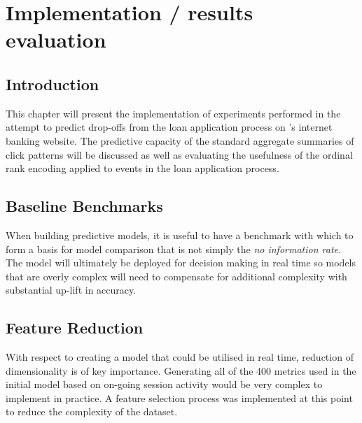 
\chapter{Implementation / results evaluation} %

\label{Chapter4} %


\section{Introduction}
This chapter will present the implementation of experiments performed in the attempt to predict drop-offs from the loan application process on \subjectname's internet banking website. The predictive capacity of the standard aggregate summaries of click patterns will be discussed as well as evaluating the usefulness of the ordinal rank encoding applied to events in the loan application process.


\section{Baseline Benchmarks}
When building predictive models, it is useful to have a benchmark with which to form a basis for model comparison that is not simply the \textit{no information rate}. The model will ultimately be deployed for decision making in real time so models that are overly complex will need to compensate for additional complexity with substantial up-lift in accuracy. 


\section{Feature Reduction}
With respect to creating a model that could be utilised in real time, reduction of dimensionality is of key importance. Generating all of the 400 metrics used in the initial model based on on-going session activity would be very complex to implement in practice. A feature selection process was implemented at this point to reduce the complexity of the dataset. 


